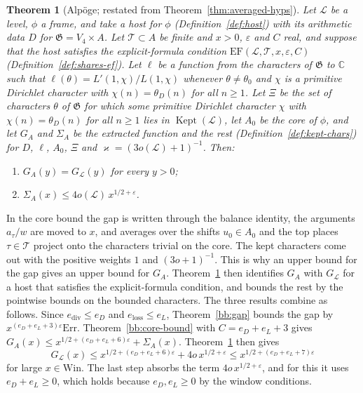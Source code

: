 \documentclass[11pt]{amsbook}
\theoremstyle{plain}
\newtheorem{theorem}{Theorem}[section]
\theoremstyle{definition}
\theoremstyle{remark}
\numberwithin{equation}{section}
\numberwithin{figure}{chapter}
\numberwithin{table}{chapter}
\renewcommand{\C}{\mathbb{C}}
\newcommand{\eps}{\varepsilon}
\newcommand{\lev}{\mathscr{L}}
\newcommand{\Kept}{\operatorname{Kept}}
\newcommand{\GG}{\mathfrak{G}}
\newcommand{\Top}{\mathcal{T}}
\newcommand{\Err}{\mathrm{Err}}
\newcommand{\Win}{\mathrm{Win}}
\begin{document}
\begin{theorem}[Alp\"oge; restated from
Theorem~\ref{thm:averaged-hyps}]
\label{bb:averaged-hyps}
Let $\lev$ be a level, $\phi$ a frame, and take a host for $\phi$
(Definition~\ref{def:host}) with its arithmetic data $D$ for
$\GG=V_4\times A$. Let $\Top\subset A$ be finite and $x>0$, $\eps$ and
$C$ real, and suppose that the host satisfies the explicit-formula
condition $\mathrm{EF}(\lev,\Top,x,\eps,C)$
(Definition~\ref{def:shares-ef}). Let $\ell$ be a function from the
characters of $\GG$ to $\C$ such that $\ell(\theta)=L'(1,\chi)/L(1,\chi)$
whenever $\theta\ne\theta_0$ and $\chi$ is a primitive Dirichlet
character with $\chi(n)=\theta_D(n)$ for all $n\ge1$. Let $\Xi$ be the
set of characters $\theta$ of $\GG$ for which some primitive Dirichlet
character $\chi$ with $\chi(n)=\theta_D(n)$ for all $n\ge1$ lies in
$\Kept(\lev)$, let $A_0$ be the core of $\phi$, and let $G_A$ and
$\Sigma_A$ be the extracted function and the rest
(Definition~\ref{def:kept-chars}) for $D$, $\ell$, $A_0$, $\Xi$ and
$\varkappa=(3o(\lev)+1)^{-1}$.
Then:
\begin{enumerate}[label=(\alph*)]
\item $G_A(y)=G_\lev(y)$ for every $y>0$;
\item $\Sigma_A(x)\le4o(\lev)\,x^{1/2+\eps}$.
\end{enumerate}
\end{theorem}

\noindent In the core bound the gap is written through the balance
identity, the arguments $a_\tau/w$ are moved to $x$, and averages
over the shifts $u_0\in A_0$ and the top places $\tau\in\Top$
project onto the characters trivial on the core. The kept characters
come out with the positive weights $1$ and $(3o+1)^{-1}$. This is
why an upper bound for the gap gives an upper bound for $G_A$.
Theorem~\ref{bb:averaged-hyps} then identifies $G_A$ with $G_\lev$
for a host that satisfies the explicit-formula condition, and bounds
the rest by the pointwise bounds on the bounded characters. The
three results combine as follows. Since $e_{\mathrm{div}}\le e_D$ and
$e_{\mathrm{loss}}\le e_L$, Theorem~\ref{bb:gap} bounds the gap by
$x^{(e_D+e_L+3)\eps}\Err$. Theorem~\ref{bb:core-bound} with
$C=e_D+e_L+3$ gives $G_A(x)\le x^{1/2+(e_D+e_L+6)\eps}+\Sigma_A(x)$.
Theorem~\ref{bb:averaged-hyps} then gives
\[
G_\lev(x)\le x^{1/2+(e_D+e_L+6)\eps}+4o\,x^{1/2+\eps}
\le x^{1/2+(e_D+e_L+7)\eps}
\]
for large $x\in\Win$. The last step absorbs the term
$4o\,x^{1/2+\eps}$, and for this it uses $e_D+e_L\ge0$, which holds
because $e_D,e_L\ge0$ by the window conditions.
\end{document}
